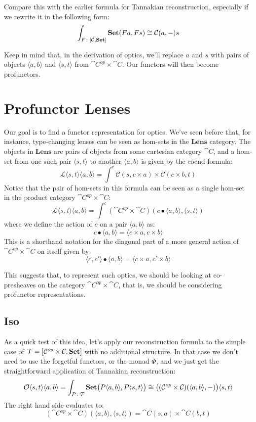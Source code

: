 \documentclass[DaoFP]{subfiles}
\begin{document}
Compare this with the earlier formula for Tannakian reconstruction, especially if we rewrite it in the following form:
\[ \int_{F \colon [\mathcal{C}, \mathbf{Set}]} \mathbf{Set} (F a, F s) \cong \mathcal{C}(a, -) s\]

Keep in mind that, in the derivation of optics, we'll replace $a$ and $s$ with pairs of objects $\langle a, b \rangle$ and $\langle s, t \rangle$  from $\cat C^{op} \times \cat C$. Our functors will then become profunctors.

\section{Profunctor Lenses}

Our goal is to find a functor representation for optics. We've seen before that, for instance, type-changing lenses can be seen as hom-sets in the $\mathbf{Lens}$ category. The objects in $\mathbf{Lens}$ are pairs of objects from some cartesian category $\cat C$, and a hom-set from one such pair $\langle s, t \rangle$ to another  $\langle a, b \rangle$ is given by the coend formula:
\[ \mathcal{L}\langle s, t\rangle \langle a, b \rangle = \int^{c} \mathcal{C}(s, c \times a) \times  \mathcal{C}(c \times b, t) \]
Notice that the pair of hom-sets in this formula can be seen as a single hom-set in the product category $\cat C^{op} \times \cat C$:
\[  \mathcal{L}\langle s, t\rangle \langle a, b \rangle =  \int^{c} (\cat C^{op} \times \cat C )(c \bullet \langle a, b \rangle, \langle s, t \rangle)  \]
where we define the action of $c$ on a pair $\langle a, b \rangle$ as:
\[ c \bullet \langle a, b \rangle = \langle c \times a, c \times b \rangle \]
This is a shorthand notation for the diagonal part of a more general action of $\cat C^{op} \times \cat C$ on itself given by:
 \[ \langle c, c' \rangle \bullet \langle a, b \rangle = \langle c \times a, c' \times b \rangle \]


This suggests that, to represent such optics, we should be looking at co-presheaves on the category $\cat C^{op} \times \cat C$, that is, we should be considering profunctor representations. 

\subsection{Iso}
As a quick test of this idea, let's apply our reconstruction formula to the simple case of $\mathcal{T} = [\mathcal{C}^{op} \times \mathcal{C}, \mathbf{Set}]$ with no additional structure. In that case we don't need to use the forgetful functors, or the monad $\Phi$, and we just get the straightforward application of Tannakian reconstruction:
\[  \mathcal{O}\langle s, t\rangle \langle a, b \rangle =\int_{P \colon \mathcal{T}} \mathbf{Set} \big(P \langle a, b\rangle, P \langle s, t\rangle \big) \cong \big( (\mathcal{C}^{op} \times \mathcal{C}) (\langle a, b\rangle ,-) \big) \langle s, t\rangle \]
The right hand side evaluates to:
\[ (\cat C^{op} \times \cat C) (\langle a, b\rangle , \langle s, t\rangle) = \cat C (s, a) \times \cat C (b, t) \]
\end{document}
